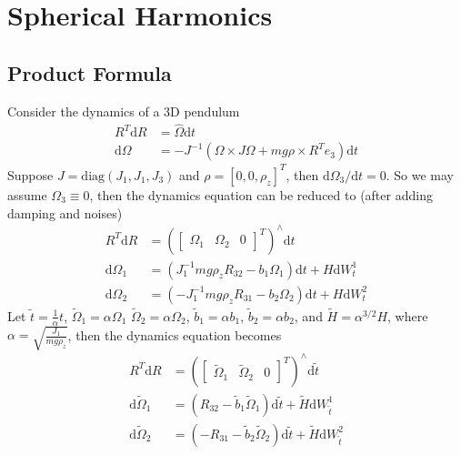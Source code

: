 \documentclass[10pt]{article}
\newcommand{\diff}[1]{\mathrm{d}#1}
\newcommand{\diag}{\ensuremath{\mathrm{diag}}}
\begin{document}
	
\section{Spherical Harmonics}

\subsection{Product Formula}

Consider the dynamics of a 3D pendulum
\begin{align}
	R^T\diff{R} &= \hat{\Omega}\diff{t} \\
	\diff{\Omega} &= -J^{-1}(\Omega\times J\Omega + mg\rho\times R^Te_3) \diff{t}
\end{align}
Suppose $J = \diag(J_1,J_1,J_3)$ and $\rho = [0,0,\rho_z]^T$, then $\diff{\Omega_3}/\diff{t} = 0$.
So we may assume $\Omega_3\equiv 0$, then the dynamics equation can be reduced to (after adding damping and noises)
\begin{align}
	R^T\diff{R} &= \left(\begin{bmatrix} \Omega_1 & \Omega_2 & 0 \end{bmatrix}^T\right)^\wedge \diff{t} \\
	\diff{\Omega_1} &= \left( J_1^{-1}mg\rho_zR_{32} - b_1\Omega_1 \right) \diff{t} + H\diff{W^1_t} \\
	\diff{\Omega_2} &= \left( -J_1^{-1}mg\rho_zR_{31} - b_2\Omega_2 \right) \diff{t} + H\diff{W^2_t}
\end{align}
Let $\tilde{t} = \tfrac{1}{\alpha} t$, $\tilde{\Omega}_1 = \alpha\Omega_1$ $\tilde{\Omega}_2 = \alpha\Omega_2$, $\tilde{b}_1 = \alpha b_1$, $\tilde{b}_2 = \alpha b_2$, and $\tilde{H} = \alpha^{3/2}H$, where $\alpha = \sqrt{\tfrac{J_1}{mg\rho_z}}$,
then the dynamics equation becomes
\begin{align}
	R^T\diff{R} &= \left(\begin{bmatrix} \tilde{\Omega}_1 & \tilde{\Omega}_2 & 0 \end{bmatrix}^T\right)^\wedge \diff{\tilde{t}} \\
	\diff{\tilde{\Omega}_1} &= \left( R_{32} - \tilde{b}_1\tilde{\Omega}_1 \right) \diff{\tilde{t}} + \tilde{H} \diff{W^1_{\tilde{t}}} \\
	\diff{\tilde{\Omega}_2} &= \left( -R_{31} - \tilde{b}_2\tilde{\Omega}_2 \right) \diff{\tilde{t}} + \tilde{H} \diff{W^2_{\tilde{t}}}
\end{align}
\end{document}
